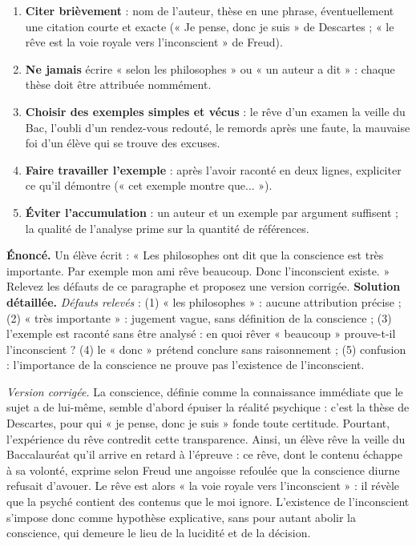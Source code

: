 \documentclass[11pt]{article}
\begin{document}
\begin{methode}
\begin{enumerate}
\item \textbf{Citer brièvement} : nom de l'auteur, thèse en une phrase, éventuellement une citation courte et exacte (« Je pense, donc je suis » de Descartes ; « le rêve est la voie royale vers l'inconscient » de Freud).
\item \textbf{Ne jamais} écrire « selon les philosophes » ou « un auteur a dit » : chaque thèse doit être attribuée nommément.
\item \textbf{Choisir des exemples simples et vécus} : le rêve d'un examen la veille du Bac, l'oubli d'un rendez-vous redouté, le remords après une faute, la mauvaise foi d'un élève qui se trouve des excuses.
\item \textbf{Faire travailler l'exemple} : après l'avoir raconté en deux lignes, expliciter ce qu'il démontre (« cet exemple montre que... »).
\item \textbf{Éviter l'accumulation} : un auteur et un exemple par argument suffisent ; la qualité de l'analyse prime sur la quantité de références.
\end{enumerate}
\end{methode}

\begin{exoresolu}
\textbf{Énoncé.} Un élève écrit : « Les philosophes ont dit que la conscience est très importante. Par exemple mon ami rêve beaucoup. Donc l'inconscient existe. » Relevez les défauts de ce paragraphe et proposez une version corrigée.
\tcblower
\textbf{Solution détaillée.}
\emph{Défauts relevés} : (1) « les philosophes » : aucune attribution précise ; (2) « très importante » : jugement vague, sans définition de la conscience ; (3) l'exemple est raconté sans être analysé : en quoi rêver « beaucoup » prouve-t-il l'inconscient ? (4) le « donc » prétend conclure sans raisonnement ; (5) confusion : l'importance de la conscience ne prouve pas l'existence de l'inconscient.

\emph{Version corrigée.} La conscience, définie comme la connaissance immédiate que le sujet a de lui-même, semble d'abord épuiser la réalité psychique : c'est la thèse de Descartes, pour qui « je pense, donc je suis » fonde toute certitude. Pourtant, l'expérience du rêve contredit cette transparence. Ainsi, un élève rêve la veille du Baccalauréat qu'il arrive en retard à l'épreuve : ce rêve, dont le contenu échappe à sa volonté, exprime selon Freud une angoisse refoulée que la conscience diurne refusait d'avouer. Le rêve est alors « la voie royale vers l'inconscient » : il révèle que la psyché contient des contenus que le moi ignore. L'existence de l'inconscient s'impose donc comme hypothèse explicative, sans pour autant abolir la conscience, qui demeure le lieu de la lucidité et de la décision.
\end{exoresolu}
\end{document}
